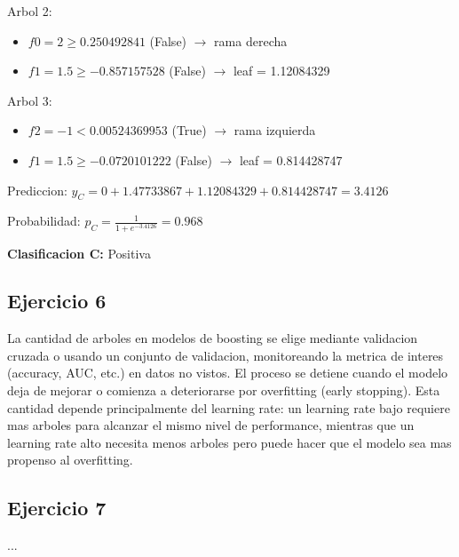 \documentclass[12pt]{article}
\begin{document}
Arbol 2:
\begin{itemize}
    \item $f0 = 2 \geq 0.250492841$ (False) $\rightarrow$ rama derecha
    \item $f1 = 1.5 \geq -0.857157528$ (False) $\rightarrow$ leaf = 1.12084329
\end{itemize}

Arbol 3:
\begin{itemize}
    \item $f2 = -1 < 0.00524369953$ (True) $\rightarrow$ rama izquierda
    \item $f1 = 1.5 \geq -0.0720101222$ (False) $\rightarrow$ leaf = 0.814428747
\end{itemize}

Prediccion: $y_C = 0 + 1.47733867 + 1.12084329 + 0.814428747 = 3.4126$

\vspace{1em}

Probabilidad: $p_C = \frac{1}{1 + e^{-3.4126}} = 0.968$

\vspace{1em}

\textbf{Clasificacion C: } Positiva

\subsection{Ejercicio 6}

La cantidad de arboles en modelos de boosting se elige mediante validacion cruzada o usando un conjunto de validacion, monitoreando la metrica de interes (accuracy, AUC, etc.) en datos no vistos. El proceso se detiene cuando el modelo deja de mejorar o comienza a deteriorarse por overfitting (early stopping). Esta cantidad depende principalmente del learning rate: un learning rate bajo requiere mas arboles para alcanzar el mismo nivel de performance, mientras que un learning rate alto necesita menos arboles pero puede hacer que el modelo sea mas propenso al overfitting.

\subsection{Ejercicio 7}

...
\end{document}
